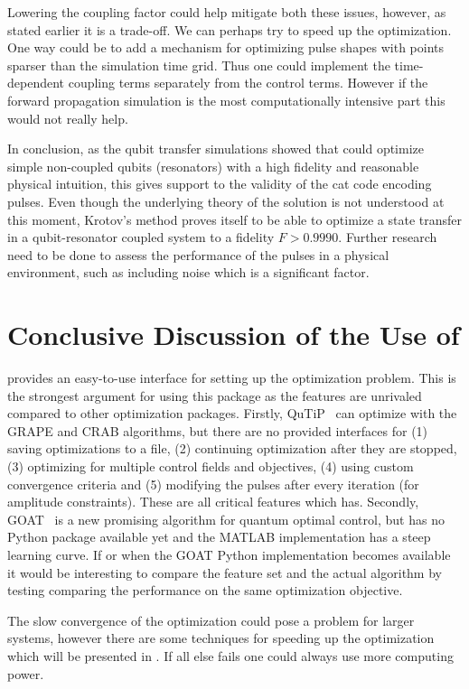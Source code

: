 \documentclass[main.tex]{subfiles}
\begin{document}
Lowering the coupling factor could help mitigate both these issues, however, as stated earlier it is a trade-off.
We can perhaps try to speed up the optimization.
One way could be to add a mechanism for optimizing pulse shapes with points sparser than the simulation time grid.
Thus one could implement the time-dependent coupling terms separately from the control terms.
However if the forward propagation simulation is the most computationally intensive part this would not really help.

In conclusion, as the qubit transfer simulations showed that \krotov{} could optimize simple non-coupled qubits (resonators) with a high fidelity and reasonable physical intuition, this gives support to the validity of the cat code encoding pulses.
Even though the underlying theory of the solution is not understood at this moment, Krotov's method proves itself to be able to optimize a state transfer in a qubit-resonator coupled system to a fidelity \(F > 0.9990\).
Further research need to be done to assess the performance of the pulses in a physical environment, such as including noise which is a significant factor.

\section{Conclusive Discussion of the Use of \krotov{}}
\label{sec:general}
\krotov{} provides an easy-to-use interface for setting up the optimization problem.
This is the strongest argument for using this package as the features are unrivaled compared to other optimization packages.
Firstly, QuTiP~\cite{johansson_qutip_2013} can optimize with the GRAPE and CRAB algorithms, but there are no provided interfaces for
(1) saving optimizations to a file,
(2) continuing optimization after they are stopped,
(3) optimizing for multiple control fields and objectives,
(4) using custom convergence criteria and 
(5) modifying the pulses after every iteration (for amplitude constraints).
These are all critical features which \krotov{} has.
Secondly, GOAT~\cite{machnes_gradient_2015} is a new promising algorithm for quantum optimal control, but has no Python package available yet and the MATLAB implementation has a steep learning curve.
If or when the GOAT Python implementation becomes available it would be interesting to compare the feature set and the actual algorithm by testing comparing the performance on the same optimization objective.

The slow convergence of the optimization could pose a problem for larger systems, however there are some techniques for speeding up the optimization which will be presented in .
If all else fails one could always use more computing power.
\end{document}
